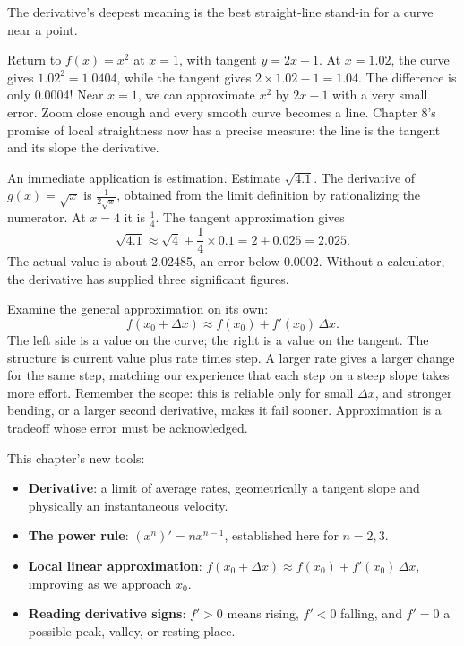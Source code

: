 The derivative's deepest meaning is the best straight-line stand-in for a curve near a point.

Return to $f(x)=x^2$ at $x=1$, with tangent $y=2x-1$. At $x=1.02$, the curve gives $1.02^2=1.0404$, while the tangent gives $2\times 1.02-1=1.04$. The difference is only 0.0004! Near $x=1$, we can approximate $x^2$ by $2x-1$ with a very small error. Zoom close enough and every smooth curve becomes a line. Chapter 8's promise of local straightness now has a precise measure: the line is the tangent and its slope the derivative.

An immediate application is estimation. Estimate $\sqrt{4.1}$. The derivative of $g(x)=\sqrt{x}$ is $\frac{1}{2\sqrt{x}}$, obtained from the limit definition by rationalizing the numerator. At $x=4$ it is $\frac{1}{4}$. The tangent approximation gives
\[
\sqrt{4.1}\approx \sqrt{4}+\frac{1}{4}\times 0.1=2+0.025=2.025.
\]
The actual value is about 2.02485, an error below 0.0002. Without a calculator, the derivative has supplied three significant figures.

Examine the general approximation on its own:
\[
f(x_0+\Delta x)\approx f(x_0)+f'(x_0)\,\Delta x.
\]
The left side is a value on the curve; the right is a value on the tangent. The structure is current value plus rate times step. A larger rate gives a larger change for the same step, matching our experience that each step on a steep slope takes more effort. Remember the scope: this is reliable only for small $\Delta x$, and stronger bending, or a larger second derivative, makes it fail sooner. Approximation is a tradeoff whose error must be acknowledged.

\begin{toolbox}
This chapter's new tools:
\begin{itemize}
  \item \textbf{Derivative}: a limit of average rates, geometrically a tangent slope and physically an instantaneous velocity.
  \item \textbf{The power rule}: $(x^n)'=nx^{n-1}$, established here for $n=2,3$.
  \item \textbf{Local linear approximation}: $f(x_0+\Delta x)\approx f(x_0)+f'(x_0)\,\Delta x$, improving as we approach $x_0$.
  \item \textbf{Reading derivative signs}: $f'>0$ means rising, $f'<0$ falling, and $f'=0$ a possible peak, valley, or resting place.
\end{itemize}
\end{toolbox}

